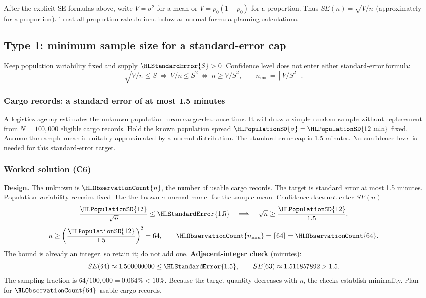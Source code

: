 After the explicit SE formulas above, write $V=\sigma^2$ for a mean or $V=p_0(1-p_0)$ for a proportion. Thus $SE(n)=\sqrt{V/n}$ (approximately for a proportion). Treat all proportion calculations below as normal-formula planning calculations.

\subsection{Type 1: minimum sample size for a standard-error cap}\label{prob:t1}
Keep population variability fixed and supply $\HLStandardError{S}>0$. Confidence level does not enter either standard-error formula:
\[
\sqrt{V/n}\le S\ \Longleftrightarrow\ V/n\le S^2
\ \Longleftrightarrow\ n\ge V/S^2,
\qquad n_{\min}=\left\lceil V/S^2\right\rceil.
\]
\medskip
\subsubsection{Cargo records: a standard error of at most 1.5 minutes}\label{prob:t1-mean}
A logistics agency estimates the unknown population mean cargo-clearance time. It will draw a simple random sample without replacement from $N=100{,}000$ eligible cargo records. Hold the known population spread $\HLPopulationSD{\sigma}=\HLPopulationSD{12\text{ min}}$ fixed. Assume the sample mean is suitably approximated by a normal distribution. The standard error cap is 1.5 minutes. No confidence level is needed for this standard-error target. 
\subsubsection*{Worked solution (C6)}\label{sol:t1-mean}
\textbf{Design.} The unknown is $\HLObservationCount{n}$, the number of usable cargo records. The target is standard error at most 1.5 minutes. Population variability remains fixed. Use the known-$\sigma$ normal model for the sample mean. Confidence does not enter $SE(n)$. 
\[
\frac{\HLPopulationSD{12}}{\sqrt n}\le \HLStandardError{1.5}\quad\Longrightarrow\quad\sqrt n\ge\frac{\HLPopulationSD{12}}{1.5}.
\]
\[n\ge\left(\frac{\HLPopulationSD{12}}{1.5}\right)^2=64,\qquad \HLObservationCount{n_{\min}}=\left\lceil 64\right\rceil=\HLObservationCount{64}.\]
The bound is already an integer, so retain it; do not add one.
\textbf{Adjacent-integer check} (minutes):
\[ SE(64)\approx1.500000000\le \HLStandardError{1.5},\qquad SE(63)\approx1.511857892>1.5.\]
The sampling fraction is $64/100{,}000=0.064\%<10\%$. Because the target quantity decreases with $n$, the checks establish minimality. Plan for $\HLObservationCount{64}$ usable cargo records. 
\clearpage
